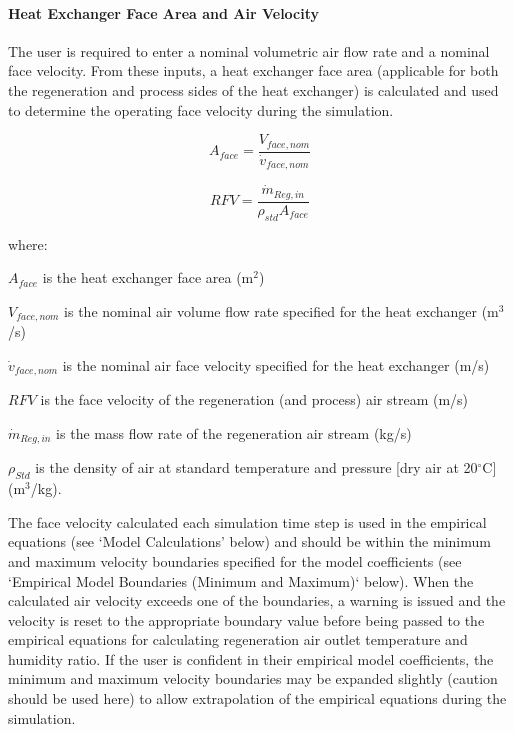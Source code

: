 \paragraph{Heat Exchanger Face Area and Air Velocity}\label{heat-exchanger-face-area-and-air-velocity}

The user is required to enter a nominal volumetric air flow rate and a nominal face velocity. From these inputs, a heat exchanger face area (applicable for both the regeneration and process sides of the heat exchanger) is calculated and used to determine the operating face velocity during the simulation.

\begin{equation}
  A_{face} = \frac{V_{face,nom}}{\dot{v}_{face,nom}}
\end{equation}

\begin{equation}
  RFV = \frac{\dot{m}_{Reg,in}}{\rho_{std}A_{face}}
\end{equation}

where:

\({A_{face}}\) is the heat exchanger face area (m\(^{2}\))

\({V_{face,nom}}\) is the nominal air volume flow rate specified for the heat exchanger (m\(^{3}\)/s)

\({\dot{v}_{face,nom}}\) is the nominal air face velocity specified for the heat exchanger (m/s)

\(RFV\) is the face velocity of the regeneration (and process) air stream (m/s)

\({\dot{m}_{Reg,in}}\) is the mass flow rate of the regeneration air stream (kg/s)

\({\rho_{Std}}\) is the density of air at standard temperature and pressure {[}dry air at 20\(^{\circ}\)C{]} (m\(^{3}\)/kg).

The face velocity calculated each simulation time step is used in the empirical equations (see `Model Calculations' below) and should be within the minimum and maximum velocity boundaries specified for the model coefficients (see `Empirical Model Boundaries (Minimum and Maximum)` below). When the calculated air velocity exceeds one of the boundaries, a warning is issued and the velocity is reset to the appropriate boundary value before being passed to the empirical equations for calculating regeneration air outlet temperature and humidity ratio. If the user is confident in their empirical model coefficients, the minimum and maximum velocity boundaries may be expanded slightly (caution should be used here) to allow extrapolation of the empirical equations during the simulation.

